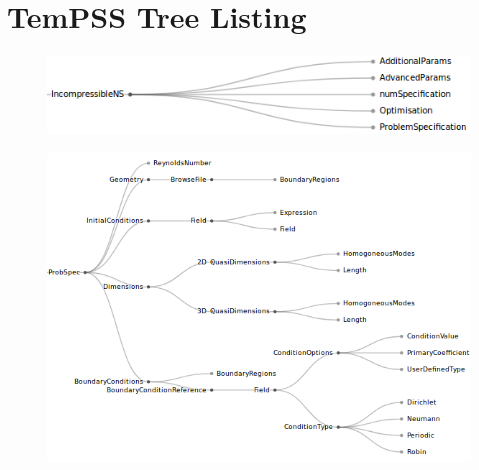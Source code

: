 \documentclass[11pt, a4paper]{report}
\begin{document}
\newpage
%

\newpage
\appendix
\chapter{TemPSS Tree Listing}
\label{app:tempss_function}
\begin{figure}[htb!]
 \centering
 \includegraphics[width=.8\linewidth,  clip=true, trim = 0cm 0cm 0cm 0cm]{overview}
 \label{fig:overview}
\end{figure}

\begin{figure}[htb!]
 \centering
 \includegraphics[width=1\linewidth,  clip=true, trim = 0cm 0cm 0cm 0cm]{problemSpecification}
 \label{fig:problemSpecification}
\end{figure}
\end{document}
